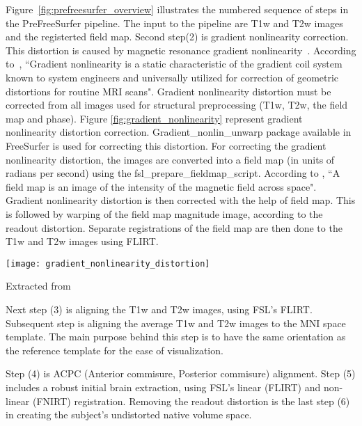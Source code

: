 Figure~\ref{fig:prefreesurfer_overview} illustrates the numbered sequence of steps in the PreFreeSurfer pipeline. The input to the pipeline are T1w and T2w images and the registerted field map. Second step(2) is gradient nonlinearity correction. This distortion is caused by magnetic resonance gradient nonlinearity~\cite{Gla13}. According to~\cite{Zou2004}, ``Gradient nonlinearity is a static characteristic of the gradient coil system known to system engineers and universally utilized for correction of geometric distortions for routine MRI scans". Gradient nonlinearity distortion must be corrected from all images used for structural preprocessing (T1w, T2w, the field map and phase). Figure \ref{fig:gradient_nonlinearity} represent gradient nonlinearity distortion correction. Gradient\_nonlin\_unwarp package available in FreeSurfer is used for correcting this distortion. For correcting the gradient nonlinearity distortion, the images are converted into a field map (in units of radians per second) using the fsl\_prepare\_fieldmap\_script. According to \cite{field_map}, ``A field map is an image of the intensity of the magnetic field across space". Gradient nonlinearity distortion is then corrected with the help of field map. This is followed by warping of the field map magnitude image, according to the readout distortion. Separate registrations of the field map are then done to the T1w and T2w images using FLIRT.

\begin{center}
  \texttt{[image: gradient\_nonlinearity\_distortion]}
  \label{fig:gradient_nonlinearity}
  \caption*{Extracted from \cite{Gla13}}
\end{center}

Next step (3) is aligning the T1w and T2w images, using FSL's FLIRT. Subsequent step is aligning the average T1w and T2w images to the MNI space template. The main purpose behind this step is to have the same orientation as the reference template for the ease of visualization.

Step (4) is ACPC (Anterior commisure, Posterior commisure) alignment. Step (5) includes a robust initial brain extraction, using FSL's linear (FLIRT) and non-linear (FNIRT) registration. Removing the readout distortion is the last step (6) in creating the subject's undistorted native volume space. %

